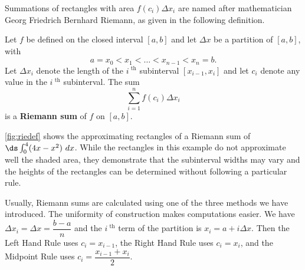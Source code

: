 Summations of rectangles with area $f(c_i)\Delta x_i$ are named after mathematician Georg Friedrich Bernhard Riemann, as given in the following definition.



{Let $f$ be defined on the closed interval $[a,b]$ and let $\Delta x$ be a partition of $[a,b]$, with 
\[a=x_0 < x_1 < \ldots < x_{n-1} < x_n=b.\]
Let $\Delta x_i$ denote the length of the $i^\text{ th}$ subinterval
$[x_{i-1},x_i]$ and let $c_i$ denote any value in the $i^\text{ th}$ subinterval. The sum
\[\sum_{i=1}^n f(c_i)\Delta x_i\]
is a \textbf{Riemann sum} of $f$ on $[a,b]$.}


\autoref{fig:riedef} shows the approximating rectangles of a Riemann sum of $\ds\int_0^4(4x-x^2)\ dx$. While the rectangles in this example do not approximate well the shaded area, they demonstrate that the subinterval widths may vary and the heights of the rectangles can be determined without following a particular rule.

Usually, Riemann sums are calculated using one of the three methods we have introduced. The uniformity of construction makes computations easier. We have $\Delta x_i = \Delta x = \dfrac{b-a}n$ and the $i^\text{ th}$ term of the partition is $x_i = a + i\Delta x$.  Then the Left Hand Rule uses $c_i=x_{i-1}$, the Right Hand Rule uses $c_i=x_i$, and the Midpoint Rule uses $c_i=\dfrac{x_{i-1}+x_i}{2}$.


%

